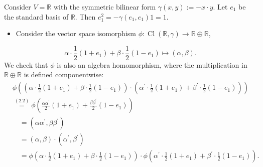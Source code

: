\documentclass[10pt, letterpaper]{article}
\begin{document}
Consider $V=\mathbb{R}$ with the symmetric bilinear form $\gamma(x, y):=-x \cdot y$. Let $e_{1}$ be the standard basis of $\mathbb{R}$. Then $e_{1}^{2}=-\gamma\left(e_{1}, e_{1}\right) 1=1$.
\begin{itemize}
  \item Consider the vector space isomorphism $\phi: \operatorname{Cl}(\mathbb{R}, \gamma) \rightarrow \mathbb{R} \oplus \mathbb{R}$,
\end{itemize}
$$
\alpha \cdot \frac{1}{2}\left(1+e_{1}\right)+\beta \cdot \frac{1}{2}\left(1-e_{1}\right) \longmapsto(\alpha, \beta) .
$$
We check that $\phi$ is also an algebra homomorphism, where the multiplication in $\mathbb{R} \oplus \mathbb{R}$ is defined componentwise:
$$
\begin{aligned}
& \phi\left(\left(\alpha \cdot \frac{1}{2}\left(1+e_{1}\right)+\beta \cdot \frac{1}{2}\left(1-e_{1}\right)\right) \cdot\left(\alpha^{\prime} \cdot \frac{1}{2}\left(1+e_{1}\right)+\beta^{\prime} \cdot \frac{1}{2}\left(1-e_{1}\right)\right)\right) \\
& \stackrel{(2.2)}{=} \phi\left(\frac{\alpha \alpha^{\prime}}{2}\left(1+e_{1}\right)+\frac{\beta \beta^{\prime}}{2}\left(1-e_{1}\right)\right) \\
& \quad=\left(\alpha \alpha^{\prime}, \beta \beta^{\prime}\right) \\
& \quad=(\alpha, \beta) \cdot\left(\alpha^{\prime}, \beta^{\prime}\right) \\
& \quad=\phi\left(\alpha \cdot \frac{1}{2}\left(1+e_{1}\right)+\beta \cdot \frac{1}{2}\left(1-e_{1}\right)\right) \cdot \phi\left(\alpha^{\prime} \cdot \frac{1}{2}\left(1+e_{1}\right)+\beta^{\prime} \cdot \frac{1}{2}\left(1-e_{1}\right)\right) .
\end{aligned}
$$
\end{document}
